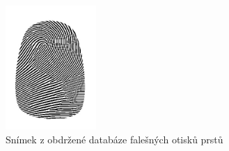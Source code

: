 \begin{figure}[htbp]
    \centering
    \includegraphics[width=130]{obrazky-figures/db1.png}
    \caption{Snímek z obdržené databáze falešných otisků prstů}
    \label{fig:lbpprincip}
\end{figure}


